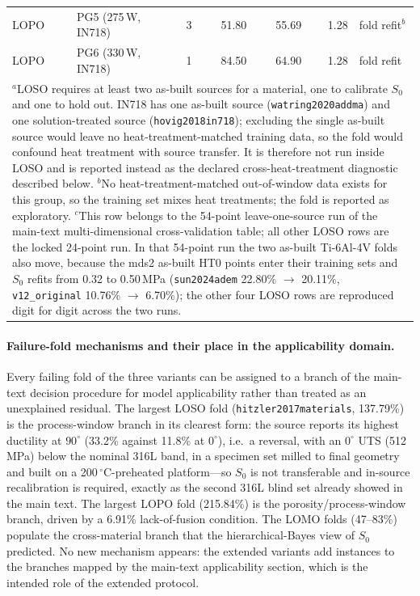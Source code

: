 \documentclass[12pt,a4paper,twocolumn]{article}
\providecommand{\ang}[1]{\ensuremath{#1^{\circ}}}
\begin{document}
\begin{table}[htbp]
\begin{tabular}{p{}p{}rrrrp{}}
LOPO & PG5 (275\,W, IN718) & 3 & 51.80 & 55.69 & 1.28 & fold refit$^{b}$ \\
LOPO & PG6 (330\,W, IN718) & 1 & 84.50 & 64.90 & 1.28 & fold refit \\
\bottomrule
\multicolumn{7}{p{0.97\textwidth}}{\footnotesize $^{a}$LOSO requires at least two as-built sources for a
material, one to calibrate $S_0$ and one to hold out. IN718 has one as-built source
(\texttt{watring2020addma}) and one solution-treated source (\texttt{hovig2018in718}); excluding the
single as-built source would leave no heat-treatment-matched training data, so the fold would confound
heat treatment with source transfer. It is therefore not run inside LOSO and is reported instead as the
declared cross-heat-treatment diagnostic described below. $^{b}$No heat-treatment-matched out-of-window
data exists for this group, so the training set mixes heat treatments; the fold is reported as
exploratory. $^{c}$This row belongs to the 54-point leave-one-source run of the main-text multi-dimensional cross-validation table; all other LOSO rows are the locked 24-point run. In that 54-point run the two as-built Ti-6Al-4V folds also move, because the mds2 as-built HT0 points enter their training sets and $S_0$ refits from 0.32 to 0.50\,MPa (\texttt{sun2024adem} 22.80\% $\rightarrow$ 20.11\%, \texttt{v12\_original} 10.76\% $\rightarrow$ 6.70\%); the other four LOSO rows are reproduced digit for digit across the two runs.}
\end{tabular}
\end{table}

\paragraph{Failure-fold mechanisms and their place in the applicability domain.}
Every failing fold of the three variants can be assigned to a branch of the main-text decision procedure
for model applicability rather than treated as an unexplained residual. The largest LOSO fold
(\texttt{hitzler2017materials}, 137.79\%) is the process-window branch in its clearest form: the source
reports its highest ductility at $\ang{90}$ (33.2\% against 11.8\% at $\ang{0}$), i.e.\ a reversal, with
an $\ang{0}$ UTS (512\,MPa) below the nominal 316L band, in a specimen set milled to final geometry and
built on a 200\,$^\circ$C-preheated platform---so $S_0$ is not transferable and in-source recalibration is
required, exactly as the second 316L blind set already showed in the main text. The
largest LOPO fold (215.84\%) is the porosity/process-window branch, driven by a 6.91\% lack-of-fusion
condition. The LOMO folds (47--83\%) populate the cross-material branch that the hierarchical-Bayes view
of $S_0$ predicted. No new mechanism appears: the extended variants add instances to the branches mapped
by the main-text applicability section, which is the intended role of the extended protocol.
\end{document}
